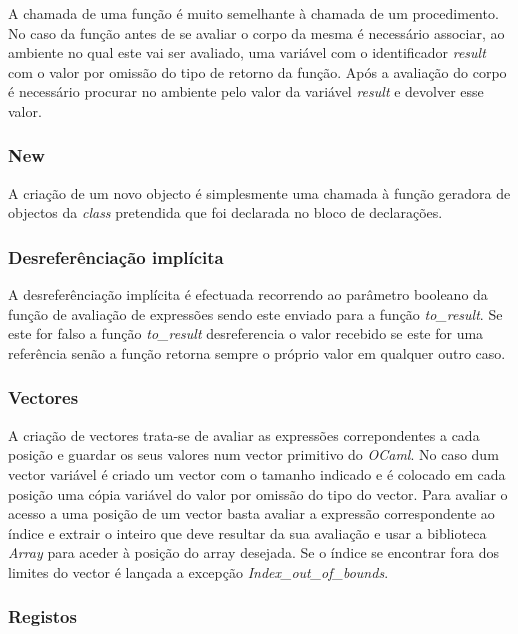 A chamada de uma função é muito semelhante à chamada de um procedimento. No 
caso da função antes de se avaliar o corpo da mesma é necessário associar, 
ao ambiente no qual este vai ser avaliado, uma variável com o identificador 
\emph{result} com o valor por omissão do tipo de retorno da função. Após a 
avaliação do corpo é necessário procurar no ambiente pelo valor da variável 
\emph{result} e devolver esse valor.

\subsubsection{New}

A criação de um novo objecto é simplesmente uma chamada à função geradora de 
objectos da \emph{class} pretendida que foi declarada no bloco de declarações.

\subsubsection{Desreferênciação implícita}

A desreferênciação implícita é efectuada recorrendo ao parâmetro booleano da 
função de avaliação de expressões sendo este enviado para a função 
\emph{to\_result}. Se este for falso a função \emph{to\_result} desreferencia 
o valor recebido se este for uma referência senão a função retorna sempre o 
próprio valor em qualquer outro caso.

\subsubsection{Vectores}

A criação de vectores trata-se de avaliar as expressões correpondentes 
a cada posição e guardar os seus valores num vector primitivo do \emph{OCaml}.
No caso dum vector variável é criado um vector com o tamanho indicado e é 
colocado em cada posição uma cópia variável do valor por omissão do tipo do 
vector.
Para avaliar o acesso a uma posição de um vector basta avaliar a expressão 
correspondente ao índice e extrair o inteiro que deve resultar da sua avaliação 
e usar a biblioteca \emph{Array} para aceder à posição do array desejada. Se o 
índice se encontrar fora dos limites do vector é lançada a excepção 
\emph{Index\_out\_of\_bounds}.

\subsubsection{Registos}

